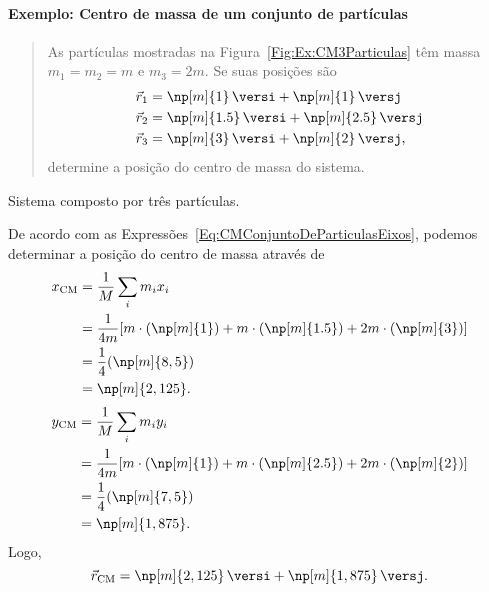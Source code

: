 \paragraph{Exemplo: Centro de massa de um conjunto de partículas}

\begin{quote}
    As partículas mostradas na Figura~\ref{Fig:Ex:CM3Particulas} têm massa $m_1 = m_2 = m$ e $m_3 = 2m$. Se suas posições são
        \begin{align}
            \vec{r}_1 &= \np[m]{1} \, \versi + \np[m]{1} \, \versj \\
            \vec{r}_2 &= \np[m]{1.5} \, \versi + \np[m]{2.5} \, \versj \\
            \vec{r}_3 &= \np[m]{3} \, \versi + \np[m]{2} \, \versj,
        \end{align}
determine a posição do centro de massa do sistema.
\end{quote}

\begin{marginfigure}
\centering
{}
\caption{Sistema composto por três partículas.\label{Fig:Ex:CM3Particulas}}
\end{marginfigure}

De acordo com as Expressões~\ref{Eq:CMConjuntoDeParticulasEixos}, podemos determinar a posição do centro de massa através de
\begin{align}
    x_{\rm{CM}} &= \frac{1}{M} \sum_{i} m_i x_i \\
    &= \frac{1}{4m} [m\cdot(\np[m]{1}) + m\cdot(\np[m]{1.5}) + 2m\cdot(\np[m]{3})] \\
    &= \frac{1}{4} (\np[m]{8,5}) \\
    &= \np[m]{2,125}.
\end{align}
%
\begin{align}
    y_{\rm{CM}} &= \frac{1}{M} \sum_{i} m_i y_i \\
    &= \frac{1}{4m} [m\cdot(\np[m]{1}) + m\cdot(\np[m]{2.5}) + 2m\cdot(\np[m]{2})] \\
    &= \frac{1}{4} (\np[m]{7,5}) \\
    &= \np[m]{1,875}.
\end{align}
%
Logo,
\begin{equation}
    \vec{r}_{\rm{CM}} = \np[m]{2,125} \, \versi + \np[m]{1,875} \, \versj.
\end{equation}

